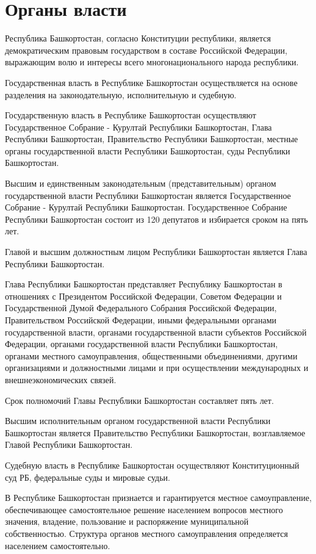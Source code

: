 


\section{Органы власти}

Республика Башкортостан, согласно Конституции республики, является демократическим правовым государством в составе Российской Федерации, выражающим волю и интересы всего многонационального народа республики.

Государственная власть в Республике Башкортостан осуществляется на основе разделения на законодательную, исполнительную и судебную.

Государственную власть в Республике Башкортостан осуществляют Государственное Собрание - Курултай Республики Башкортостан, Глава Республики Башкортостан, Правительство Республики Башкортостан, местные органы государственной власти Республики Башкортостан, суды Республики Башкортостан.

Высшим и единственным законодательным (представительным) органом государственной власти Республики Башкортостан является Государственное Собрание - Курултай Республики Башкортостан. Государственное Собрание Республики Башкортостан состоит из 120 депутатов и избирается сроком на пять лет.

Главой и высшим должностным лицом Республики Башкортостан является Глава Республики Башкортостан.

Глава Республики Башкортостан представляет Республику Башкортостан в отношениях с Президентом Российской Федерации, Советом Федерации и Государственной Думой Федерального Собрания Российской Федерации, Правительством Российской Федерации, иными федеральными органами государственной власти, органами государственной власти субъектов Российской Федерации, органами государственной власти Республики Башкортостан, органами местного самоуправления, общественными объединениями, другими организациями и должностными лицами и при осуществлении международных и внешнеэкономических связей.

Срок полномочий Главы Республики Башкортостан составляет пять лет.

Высшим исполнительным органом государственной власти Республики Башкортостан является Правительство Республики Башкортостан, возглавляемое Главой Республики Башкортостан.

Судебную власть в Республике Башкортостан осуществляют Конституционный суд РБ, федеральные суды и мировые судьи.

В Республике Башкортостан признается и гарантируется местное самоуправление, обеспечивающее самостоятельное решение населением вопросов местного значения, владение, пользование и распоряжение муниципальной собственностью. Структура органов местного самоуправления определяется населением самостоятельно.

